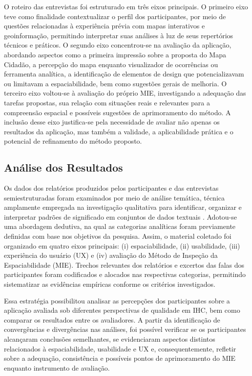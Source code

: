 \documentclass[12pt]{article}
\begin{document}
O roteiro das entrevistas foi estruturado em três eixos principais. O primeiro eixo teve como finalidade contextualizar o perfil dos participantes, por meio de questões relacionadas à experiência prévia com mapas interativos e geoinformação, permitindo interpretar suas análises à luz de seus repertórios técnicos e práticos. O segundo eixo concentrou-se na avaliação da aplicação, abordando aspectos como a primeira impressão sobre a proposta do Mapa Cidadão, a percepção do mapa enquanto visualizador de ocorrências ou ferramenta analítica, a identificação de elementos de design que potencializavam ou limitavam a espaciabilidade, bem como sugestões gerais de melhoria. O terceiro eixo voltou-se à avaliação do próprio MIE, investigando a adequação das tarefas propostas, sua relação com situações reais e relevantes para a compreensão espacial e possíveis sugestões de aprimoramento do método. A inclusão desse eixo justifica-se pela necessidade de avaliar não apenas os resultados da aplicação, mas também a validade, a aplicabilidade prática e o potencial de refinamento do método proposto.



\subsection{Análise dos Resultados}

Os dados dos relatórios produzidos pelos participantes e das entrevistas semiestruturadas foram examinados por meio de análise temática, técnica amplamente empregada na investigação qualitativa para identificar, organizar e interpretar padrões de significado em conjuntos de dados textuais \cite{rosa:2021}. Adotou-se uma abordagem dedutiva, na qual as categorias analíticas foram previamente definidas com base nos objetivos da pesquisa. Assim, o material coletado foi organizado em quatro eixos principais: (i) espaciabilidade, (ii) usabilidade, (iii) experiência do usuário (UX) e (iv) avaliação do Método de Inspeção da Espaciabilidade (MIE). Trechos relevantes dos relatórios e excertos das falas dos participantes foram codificados e alocados nas respectivas categorias, permitindo sistematizar as evidências empíricas conforme os critérios investigados.

Essa estratégia possibilitou analisar as percepções dos participantes sobre a aplicação avaliada sob diferentes perspectivas de qualidade em IHC, bem como comparar os resultados entre os avaliadores. A partir da identificação de convergências e divergências nas análises, foi possível verificar se os participantes alcançaram conclusões semelhantes, se evidenciaram aspectos distintos relacionados à espaciabilidade, usabilidade e UX e, consequentemente, refletir sobre a adequação, consistência e possíveis pontos de aprimoramento do MIE enquanto instrumento de avaliação.
\end{document}
